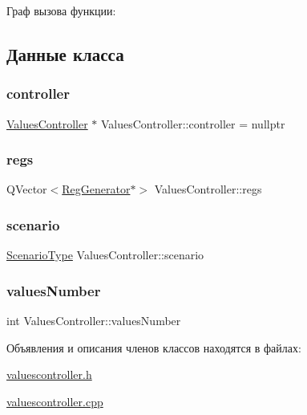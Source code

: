 Граф вызова функции\+:


\subsection{Данные класса}
\mbox{\label{class_values_controller_a9b8eb343037a5c1a18f96d466da5a670}} 
\subsubsection{\texorpdfstring{controller}{controller}}
{\footnotesize\ttfamily \hyperlink{class_values_controller}{Values\+Controller} $\ast$ Values\+Controller\+::controller = nullptr\hspace{0.3cm}{\ttfamily [static]}}

\mbox{\label{class_values_controller_ae075adf59c65d6230c7b2caa41c768c5}} 
\subsubsection{\texorpdfstring{regs}{regs}}
{\footnotesize\ttfamily Q\+Vector$<$\hyperlink{class_reg_generator}{Reg\+Generator}$\ast$$>$ Values\+Controller\+::regs}

\mbox{\label{class_values_controller_abe823f9457bb23b60428a5c6ea7aeedb}} 
\subsubsection{\texorpdfstring{scenario}{scenario}}
{\footnotesize\ttfamily \hyperlink{_random_types_8h_ae8f073eec97d33cf9783ecbe50531dfd}{Scenario\+Type} Values\+Controller\+::scenario}

\mbox{\label{class_values_controller_abfd5066e990c480cd415979a208e6d91}} 
\subsubsection{\texorpdfstring{values\+Number}{valuesNumber}}
{\footnotesize\ttfamily int Values\+Controller\+::values\+Number}



Объявления и описания членов классов находятся в файлах\+:\begin{DoxyCompactItemize}
\item 
\hyperlink{valuescontroller_8h}{valuescontroller.\+h}\item 
\hyperlink{valuescontroller_8cpp}{valuescontroller.\+cpp}\end{DoxyCompactItemize}
